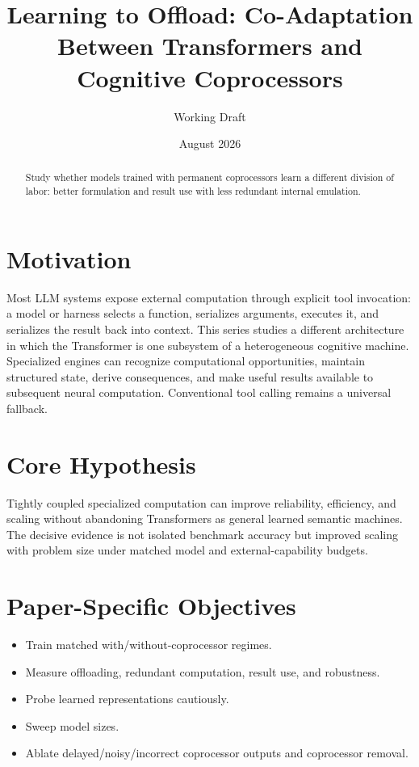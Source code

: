 \documentclass[11pt]{article}
\title{Learning to Offload: Co-Adaptation Between Transformers and Cognitive Coprocessors}
\author{Working Draft}
\date{August 2026}
\begin{document}
\maketitle
\begin{abstract}
Study whether models trained with permanent coprocessors learn a different division of labor: better formulation and result use with less redundant internal emulation.
\end{abstract}

\section{Motivation}
Most LLM systems expose external computation through explicit tool invocation: a model or harness selects a function, serializes arguments, executes it, and serializes the result back into context. This series studies a different architecture in which the Transformer is one subsystem of a heterogeneous cognitive machine. Specialized engines can recognize computational opportunities, maintain structured state, derive consequences, and make useful results available to subsequent neural computation. Conventional tool calling remains a universal fallback.

\section{Core Hypothesis}
Tightly coupled specialized computation can improve reliability, efficiency, and scaling without abandoning Transformers as general learned semantic machines. The decisive evidence is not isolated benchmark accuracy but improved scaling with problem size under matched model and external-capability budgets.

\section{Paper-Specific Objectives}
\begin{itemize}
\item Train matched with/without-coprocessor regimes.
\item Measure offloading, redundant computation, result use, and robustness.
\item Probe learned representations cautiously.
\item Sweep model sizes.
\item Ablate delayed/noisy/incorrect coprocessor outputs and coprocessor removal.
\end{itemize}
\end{document}
